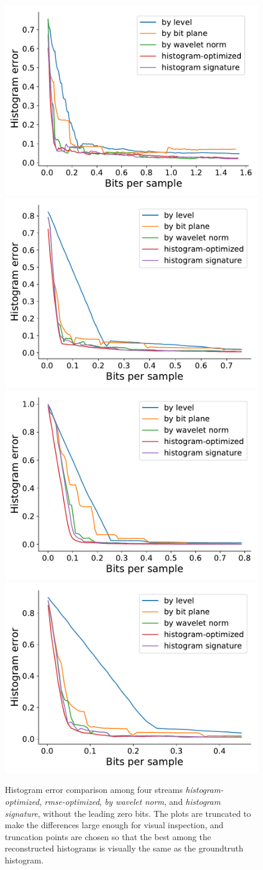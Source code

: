 \begin{figure}[h]
	\centering
	{\includegraphics[width=0.48\linewidth]{img/histogram/64bins/histogram-optimized-boiler.pdf}}
	{\includegraphics[width=0.48\linewidth]{img/histogram/64bins/histogram-optimized-diffusivity.pdf}}
	{\includegraphics[width=0.48\linewidth]{img/histogram/64bins/histogram-optimized-euler.pdf}}
	{\includegraphics[width=0.48\linewidth]{img/histogram/64bins/histogram-optimized-pressure.pdf}}
	\caption{Histogram error comparison among four streams \emph{histogram-optimized},
	\emph{rmse-optimized}, \emph{by wavelet norm}, and \emph{histogram signature}, without the leading
	zero bits. The plots are truncated to make the differences large enough for visual inspection, and
	truncation points are chosen so that the best among the reconstructed histograms is visually the
	same as the groundtruth histogram. }
	\label{fig:histogram-stream-comparison}
\end{figure}


